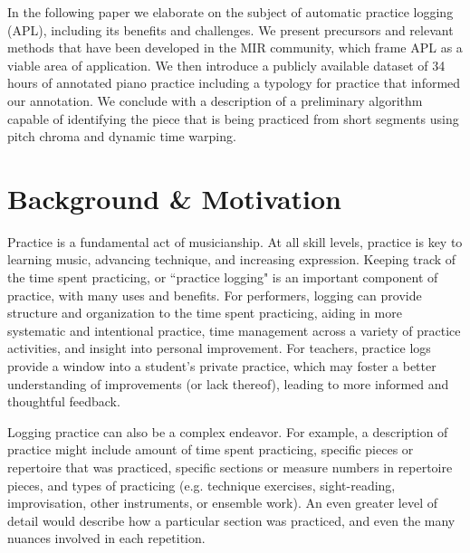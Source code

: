 \documentclass{article}
\begin{document}
In the following paper we elaborate on the subject of automatic practice logging (APL), including its benefits and challenges. We present precursors and relevant methods that have been developed in the MIR community, which frame APL as a viable area of application. We then introduce a publicly available dataset of 34 hours of annotated piano practice including a typology for practice that informed our annotation.
We conclude with a description of a preliminary algorithm capable of identifying the piece that is being practiced from short segments using pitch chroma and dynamic time warping.   



\section{Background \& Motivation}

Practice is a fundamental act of musicianship.  
At all skill levels, practice is key to learning music, advancing technique, and increasing expression.  
Keeping track of the time spent practicing, or ``practice logging" is an important component of practice, with many uses and benefits. 
For performers, logging can provide structure and organization to the time spent practicing, aiding in more systematic and intentional practice, time management across a variety of practice activities, and insight into personal improvement. 
For teachers, practice logs provide a window into a student's private practice, which may foster a better understanding of improvements (or lack thereof), leading to more informed and thoughtful feedback.    

Logging practice can also be a complex endeavor. 
For example, a description of practice might include amount of time spent practicing, specific pieces or repertoire that was practiced, specific sections or measure numbers in repertoire pieces, and types of practicing (e.g. technique exercises, sight-reading, improvisation, other instruments, or ensemble work). 
An even greater level of detail would describe how a particular section was practiced, and even the many nuances involved in each repetition.
\end{document}
